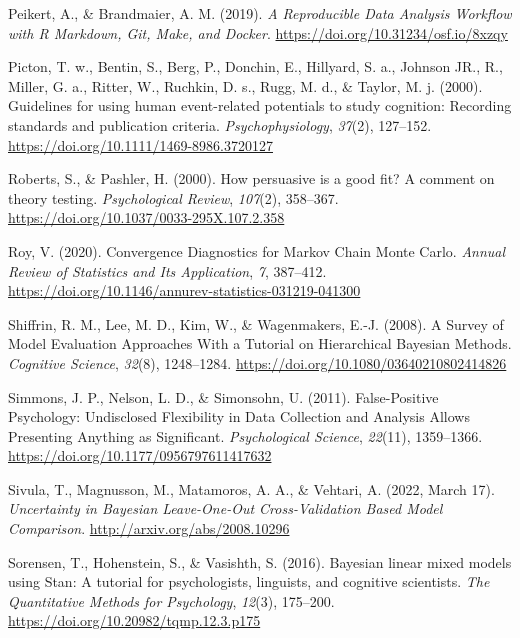 \documentclass[
  doc,12pt,floatsintext]{apa7}
\newlength{\cslhangindent}
\newenvironment{CSLReferences}[2] %
 {\begin{list}{}{%
  \setlength{\itemindent}{0pt}
  \setlength{\leftmargin}{0pt}
  \setlength{\parsep}{0pt}
  \ifodd #1
   \setlength{\leftmargin}{\cslhangindent}
   \setlength{\itemindent}{-1\cslhangindent}
  \fi
  \setlength{\itemsep}{#2\baselineskip}}}
 {\end{list}}
\begin{document}
\begin{CSLReferences}{1}{0}
Peikert, A., \& Brandmaier, A. M. (2019). \emph{A {Reproducible Data Analysis Workflow} with {R Markdown}, {Git}, {Make}, and {Docker}}. \url{https://doi.org/10.31234/osf.io/8xzqy}

Picton, T. w., Bentin, S., Berg, P., Donchin, E., Hillyard, S. a., Johnson JR., R., Miller, G. a., Ritter, W., Ruchkin, D. s., Rugg, M. d., \& Taylor, M. j. (2000). Guidelines for using human event-related potentials to study cognition: {Recording} standards and publication criteria. \emph{Psychophysiology}, \emph{37}(2), 127--152. \url{https://doi.org/10.1111/1469-8986.3720127}

Roberts, S., \& Pashler, H. (2000). How persuasive is a good fit? {A} comment on theory testing. \emph{Psychological Review}, \emph{107}(2), 358--367. \url{https://doi.org/10.1037/0033-295X.107.2.358}

Roy, V. (2020). Convergence {Diagnostics} for {Markov Chain Monte Carlo}. \emph{Annual Review of Statistics and Its Application}, \emph{7}, 387--412. \url{https://doi.org/10.1146/annurev-statistics-031219-041300}

Shiffrin, R. M., Lee, M. D., Kim, W., \& Wagenmakers, E.-J. (2008). A {Survey} of {Model Evaluation Approaches With} a {Tutorial} on {Hierarchical Bayesian Methods}. \emph{Cognitive Science}, \emph{32}(8), 1248--1284. \url{https://doi.org/10.1080/03640210802414826}

Simmons, J. P., Nelson, L. D., \& Simonsohn, U. (2011). False-{Positive Psychology}: {Undisclosed Flexibility} in {Data Collection} and {Analysis Allows Presenting Anything} as {Significant}. \emph{Psychological Science}, \emph{22}(11), 1359--1366. \url{https://doi.org/10.1177/0956797611417632}

Sivula, T., Magnusson, M., Matamoros, A. A., \& Vehtari, A. (2022, March 17). \emph{Uncertainty in {Bayesian Leave-One-Out Cross-Validation Based Model Comparison}}. \url{http://arxiv.org/abs/2008.10296}

Sorensen, T., Hohenstein, S., \& Vasishth, S. (2016). Bayesian linear mixed models using {Stan}: {A} tutorial for psychologists, linguists, and cognitive scientists. \emph{The Quantitative Methods for Psychology}, \emph{12}(3), 175--200. \url{https://doi.org/10.20982/tqmp.12.3.p175}


\end{CSLReferences}
\end{document}
